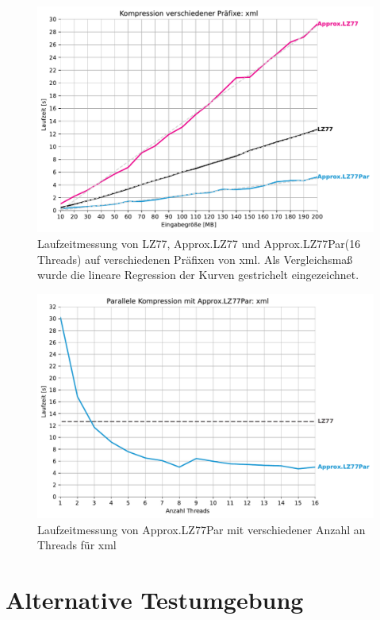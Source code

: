 \begin{figure}
    \centering
    \caption{Laufzeitmessung von LZ77, Approx.LZ77 und Approx.LZ77Par(16 Threads) auf verschiedenen Präfixen von xml. Als Vergleichsmaß wurde 
    die lineare Regression der Kurven gestrichelt eingezeichnet.}
    \includegraphics[scale=0.6]{Images/progressive_xml.pdf}
\end{figure}

\begin{figure}
    \centering
    \caption{Laufzeitmessung von Approx.LZ77Par mit verschiedener Anzahl an Threads für xml}
    \includegraphics[scale=0.6]{Images/progressive_speedup_xml.pdf}
\end{figure}

\section{Alternative Testumgebung}